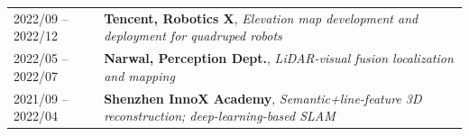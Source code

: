 %
%


 
			

\begin{tabular}{ll}
	\textsc{2022/09 -- 2022/12}			  & \textbf{Tencent, Robotics X}, \emph{Elevation map development and deployment for quadruped robots}\\
	\textsc{2022/05 -- 2022/07} 	&  \textbf{Narwal, Perception Dept.}, \emph{LiDAR-visual fusion localization and mapping}\\
	\textsc{2021/09 -- 2022/04} 	&  \textbf{Shenzhen InnoX Academy}, \emph{Semantic+line-feature 3D reconstruction; deep-learning-based SLAM}\\

\end{tabular}